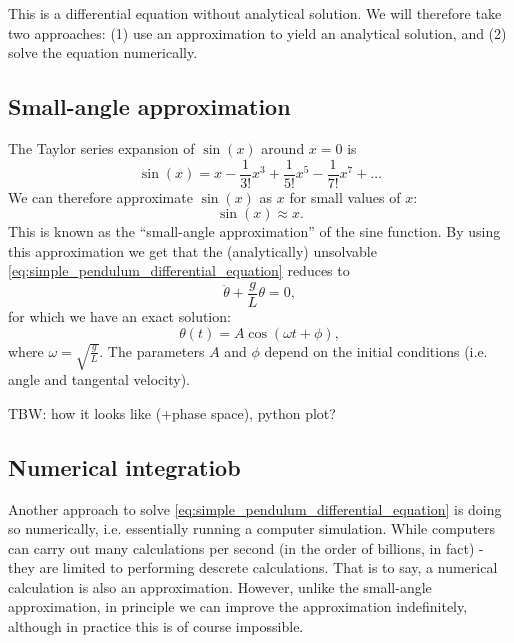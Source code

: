 This is a differential equation without analytical solution. We will therefore take two approaches: (1) use an approximation to yield an analytical solution, and (2) solve the equation numerically.

\subsection{Small-angle approximation}
The Taylor series expansion of $\sin(x)$ around $x=0$ is
\begin{equation}
	\sin(x) = x - \frac{1}{3!}x^{3} + \frac{1}{5!}x^{5} - \frac{1}{7!}x^{7} + \dots
	\label{eq:taylor_series_sin}
\end{equation}
We can therefore approximate $\sin(x)$ as $x$ for small values of $x$:
\begin{equation}
	\sin(x) \approx x.
	\label{eq:sin_small_angle_approx}
\end{equation}
This is known as the \enquote{small-angle approximation} of the sine function. By using this approximation we get that the (analytically) unsolvable \autoref{eq:simple_pendulum_differential_equation} reduces to
\begin{equation}
	\ddot{\theta} + \frac{g}{L}\theta = 0,
	\label{eq:simple_pendulum_small_angle_equation}
\end{equation}
for which we have an exact solution:
\begin{equation}
	\theta(t) = A\cos\left(\omega t+\phi\right),
	\label{eq:simple_pendulum_small_angle_solution}
\end{equation}
where $\omega=\sqrt{\frac{g}{L}}$. The parameters $A$ and $\phi$ depend on the initial conditions (i.e. angle and tangental velocity).

TBW: how it looks like (+phase space), python plot?

\subsection{Numerical integratiob}
Another approach to solve \autoref{eq:simple_pendulum_differential_equation} is doing so numerically, i.e. essentially running a computer simulation. While computers can carry out many calculations per second (in the order of billions, in fact) - they are limited to performing descrete calculations. That is to say, a numerical calculation is also an approximation. However, unlike the small-angle approximation, in principle we can improve the approximation indefinitely, although in practice this is of course impossible.

